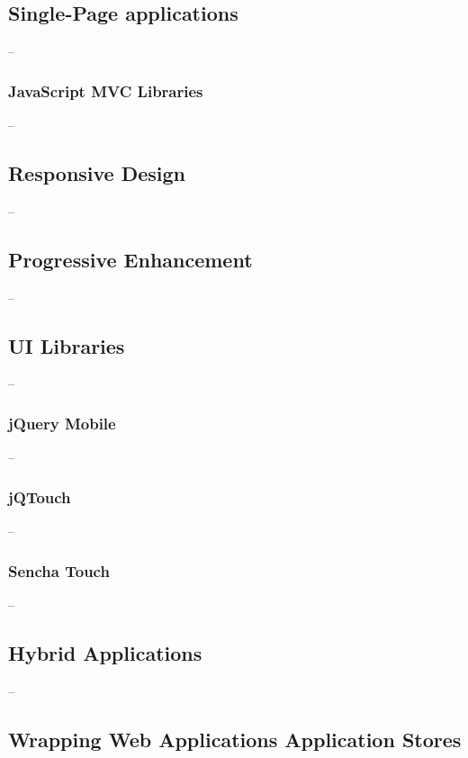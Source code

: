 \subsection{Single-Page applications}

--

\subsubsection{JavaScript MVC Libraries}

--

\subsection{Responsive Design}

--

\subsection{Progressive Enhancement}
\label{subsection:progressive-enhancement}

--

\subsection{UI Libraries}

--

\subsubsection{jQuery Mobile}

--

\subsubsection{jQTouch}

--

\subsubsection{Sencha Touch}

--

\subsection{Hybrid Applications}

--

\subsection{Wrapping Web Applications Application Stores}

